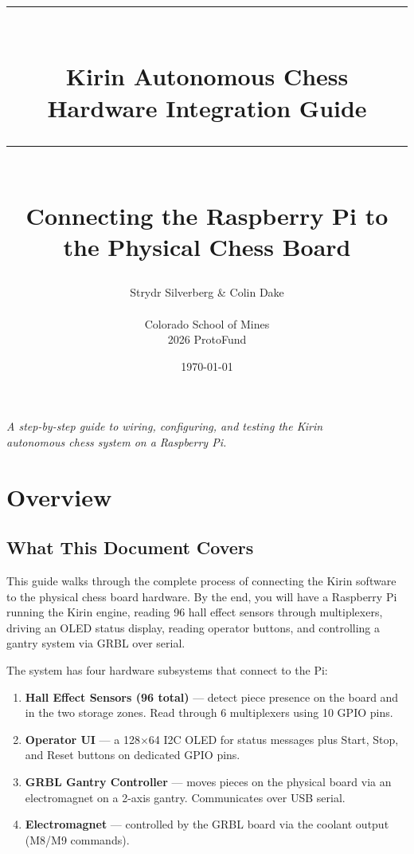 \documentclass[11pt,a4paper]{report}
\title{%
    \vspace{-1cm}
    \rule{\textwidth}{1pt}\\[0.5cm]
    {\Huge\bfseries Kirin Autonomous Chess}\\[0.3cm]
    {\Large Hardware Integration Guide}\\[0.3cm]
    \rule{\textwidth}{1pt}\\[1cm]
    {\large Connecting the Raspberry Pi to the Physical Chess Board}
}
\author{Strydr Silverberg \& Colin Dake\\\\Colorado School of Mines\\2026 ProtoFund}
\date{\today}
\begin{document}
\maketitle
\thispagestyle{empty}

\vfill
\begin{center}
    \textit{A step-by-step guide to wiring, configuring, and testing the Kirin\\
    autonomous chess system on a Raspberry Pi.}
\end{center}
\vfill

\newpage
\tableofcontents
\newpage

\chapter{Overview}

\section{What This Document Covers}

This guide walks through the complete process of connecting the Kirin software to the physical chess board hardware. By the end, you will have a Raspberry Pi running the Kirin engine, reading 96 hall effect sensors through multiplexers, driving an OLED status display, reading operator buttons, and controlling a gantry system via GRBL over serial.

The system has four hardware subsystems that connect to the Pi:

\begin{enumerate}
    \item \textbf{Hall Effect Sensors (96 total)} --- detect piece presence on the board and in the two storage zones. Read through 6 multiplexers using 10 GPIO pins.
    \item \textbf{Operator UI} --- a 128$\times$64 I2C OLED for status messages plus Start, Stop, and Reset buttons on dedicated GPIO pins.
    \item \textbf{GRBL Gantry Controller} --- moves pieces on the physical board via an electromagnet on a 2-axis gantry. Communicates over USB serial.
    \item \textbf{Electromagnet} --- controlled by the GRBL board via the coolant output (M8/M9 commands).
\end{enumerate}
\end{document}
